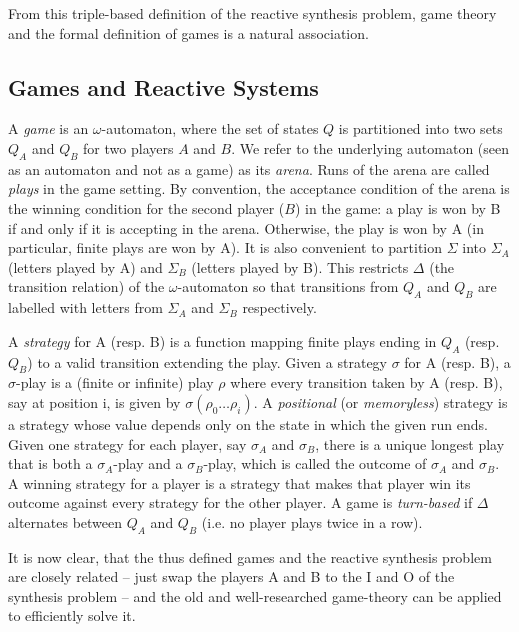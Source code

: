 From this triple-based definition of the reactive synthesis problem, game theory and the formal definition of games is a natural association.

\subsection{Games and Reactive Systems}

A \textit{game} is an $\omega$-automaton, where the set of states $Q$ is partitioned into two sets $Q_A$ and $Q_B$ for two players $A$ and $B$. We refer to the underlying automaton (seen as an automaton and not as a game) as its \textit{arena}. Runs of the arena are called \textit{plays} in the game setting. By convention, the acceptance condition of the arena is the winning condition for the second player ($B$) in the game: a play is won by B if and only if it is accepting in the arena. Otherwise, the play is won by A (in particular, finite plays are won by A). It is also convenient to partition $\Sigma$ into $\Sigma_A$ (letters played by A) and $\Sigma_B$ (letters played by B). This restricts $\Delta$ (the transition relation) of the $\omega$-automaton so that transitions from $Q_A$ and $Q_B$ are labelled with letters from $\Sigma_A$ and  $\Sigma_B$ respectively.

A \textit{strategy} for A (resp. B) is a function mapping finite plays ending in $Q_A$ (resp. $Q_B$) to a valid transition extending the play. Given a strategy $\sigma$ for A (resp. B), a $\sigma$-play is a (finite or infinite) play $\rho$ where every transition taken by A (resp. B), say at position i, is given by $\sigma ( \rho_0 \dots \rho_i)$. A \textit{positional} (or \textit{memoryless}) strategy is a strategy whose value depends only on the state in which the given run ends. Given one strategy for each player, say $\sigma_A$ and $\sigma_B$, there is a unique longest play that is both a $\sigma_A$-play and a $\sigma_B$-play, which is called the outcome of $\sigma_A$ and $\sigma_B$. A winning strategy for a player is a strategy that makes that player win its outcome against every strategy for the other player. A game is \textit{turn-based} if $\Delta$ alternates between $Q_A$ and $Q_B$ (i.e. no player plays twice in a row).

It is now clear, that the thus defined games and the reactive synthesis problem are closely related -- just swap the players A and B to the I and O of the synthesis problem -- and the old and well-researched game-theory can be applied to efficiently solve it.

